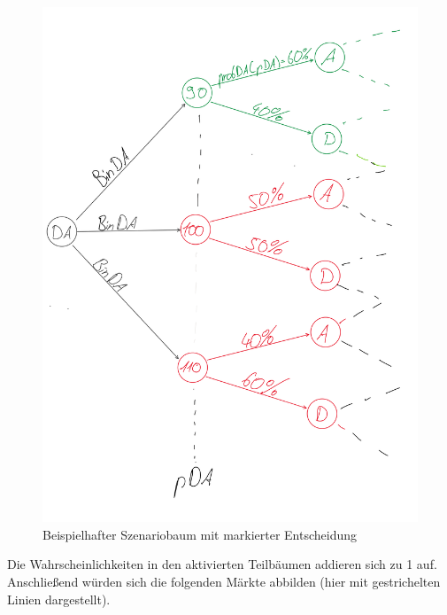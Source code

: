 \documentclass{article}
\begin{document}
\begin{figure}[H]
    \centering
    \includegraphics[width=1\linewidth]{pictures/szBaumBeispiel_markiert.png}
    \caption{Beispielhafter Szenariobaum mit markierter Entscheidung}
    \label{fig:enter-label}
\end{figure}

Die Wahrscheinlichkeiten in den aktivierten Teilbäumen addieren sich zu 1 auf.
Anschließend würden sich die folgenden Märkte abbilden (hier mit gestrichelten Linien dargestellt).\\
\end{document}
